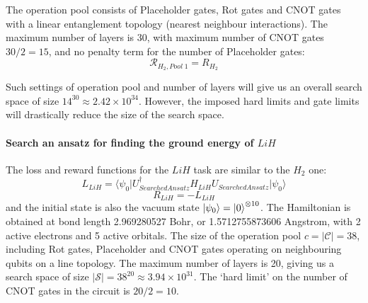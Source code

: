 \documentclass[a4paper,onecolumn,11pt]{quantumarticle}
\begin{document}
The operation pool consists of Placeholder gates, Rot gates and CNOT gates with a linear entanglement topology (nearest neighbour interactions). The maximum number of layers is 30, with maximum number of CNOT gates $30/2 = 15$, and no penalty term for the number of Placeholder gates:
\begin{equation}
    \mathcal{R}_{H_2, Pool\;1} = R_{H_2}
\end{equation}

Such settings of operation pool and number of layers will give us an overall search space of size $14^{30}\approx 2.42\times 10^{34}$. However, the imposed hard limits and gate limits will drastically reduce the size of the search space.


\paragraph{Search an ansatz for finding the ground energy of $LiH$}
The loss and reward functions for the $LiH$ task are similar to the $H_2$ one:
\begin{equation}
    L_{LiH} =\langle \psi_0 \vert U_{SearchedAnsatz}^{\dagger} H_{LiH} U_{SearchedAnsatz} \vert \psi_0\rangle
\end{equation}
\begin{equation}
    R_{LiH} = -L_{LiH}
\end{equation}
and the initial state is also the vacuum state $\ket{\psi_0} = \ket{0}^{\otimes 10}$. The Hamiltonian is obtained at bond length 2.969280527 Bohr, or 1.5712755873606 Angstrom, with 2 active electrons and 5 active orbitals. The size of the operation pool $c = \vert \mathcal{C} \vert = 38$, including Rot gates, Placeholder and CNOT gates operating on neighbouring qubits on a line topology. The maximum number of layers is 20, giving us a search space of size $\vert \mathcal{S} \vert = 38^{20} \approx 3.94\times 10^{31}$. The `hard limit' on the number of CNOT gates in the circuit is $20/2=10$.
\end{document}
